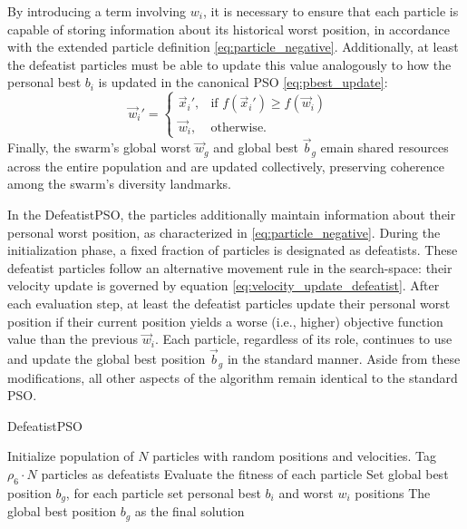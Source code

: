 {By introducing a term involving $w_i$, it is necessary to ensure that each particle is capable of storing information about its historical worst position, in accordance with the extended particle definition \eqref{eq:particle_negative}. Additionally, at least the defeatist particles must be able to update this value analogously to how the personal best  $b_i$ is updated in the canonical PSO \eqref{eq:pbest_update}:
\begin{equation}
\vec{w}_i' = 
    \begin{cases}
    \vec{x}_i', & \text{if } f(\vec{x}_i') \geq f(\vec{w}_i) \\ %
    \vec{w}_i, & \text{otherwise.}
    \end{cases}
\quad \label{eq:pworst_update_defeatist}
\end{equation}
Finally, the swarm's global worst $\vec{w}_g$ and global best $\vec{b}_g$ emain shared resources across the entire population and are updated collectively, preserving coherence among the swarm’s diversity landmarks.


In the DefeatistPSO, the particles additionally maintain information about their personal worst position, as characterized in \eqref{eq:particle_negative}. During the initialization phase, a fixed fraction of particles is designated as defeatists. These defeatist particles follow an alternative movement rule in the \gls{search-space}: their velocity update is governed by equation \eqref{eq:velocity_update_defeatist}. After each evaluation step, at least the defeatist particles update their personal worst position if their current position yields a worse (i.e., higher) objective function value than the previous $\vec{w}_i$. Each particle, regardless of its role, continues to use and update the global best position $\vec{b}_g$ in the standard manner. Aside from these modifications, all other aspects of the algorithm remain identical to the standard PSO.

\vspace{.935em}
\begin{algorithm}[H]
\caption{DefeatistPSO}\label{alg:defeatist}
Initialize population of \(N\) particles with random positions and velocities. Tag \(\rho_6 \cdot N\) particles as defeatists\;
Evaluate the fitness of each particle\;
Set global best position \(b_g\), for each particle set personal best \(b_i\) and worst \(w_i\) positions\;
\Return The global best position \(b_g\) as the final solution\;
\end{algorithm}
\vspace{.935em}


}

